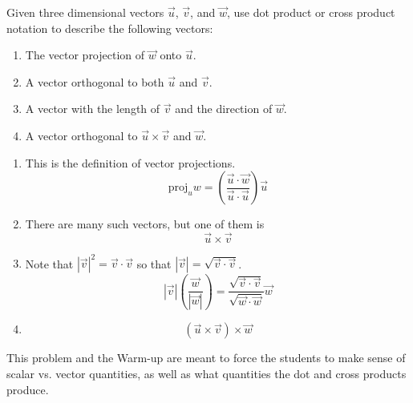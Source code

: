 \documentclass[noinstructornotes]{ximera}
\begin{document}
\begin{problem}
Given three dimensional vectors $\vec{u}$, $\vec{v}$, and $\vec{w}$, use dot product or cross product notation to describe the following vectors:
	\begin{enumerate}
	\item  The vector projection of $\vec{w}$ onto $\vec{u}$.
	
	\item  A vector orthogonal to both $\vec{u}$ and $\vec{v}$.
	
	\item  A vector with the length of $\vec{v}$ and the direction of $\vec{w}$.  
	
	\item  A vector orthogonal to $\vec{u} \times \vec{v}$ and $\vec{w}$.
	\end{enumerate}
	
	\begin{freeResponse}
	\begin{enumerate}
	\item  This is the definition of vector projections.
		\[
		\text{proj}_u w = \boxed{\left( \frac{\vec{u} \cdot \vec{w}}{\vec{u} \cdot \vec{u}} \right) \vec{u}}
		\]
	
	\item  There are many such vectors, but one of them is
		\[
		\boxed{\vec{u} \times \vec{v}}
		\]
	
	\item  Note that $|\vec{v}|^2 = \vec{v} \cdot \vec{v}$ so that $|\vec{v}|=\sqrt{\vec{v} \cdot \vec{v}}$. 
		\[
		| \vec{v} | \left( \frac{\vec{w}}{| \vec{w} |} \right) = \boxed{ \frac{\sqrt{\vec{v} \cdot \vec{v}}}{\sqrt{\vec{w} \cdot \vec{w}}} \vec{w}}
		\]
	
	\item  
		\[
		\boxed{(\vec{u} \times \vec{v}) \times \vec{w}}
		\]
	\end{enumerate}
	\end{freeResponse}
	
\end{problem}

\begin{instructorNotes}
This problem and the Warm-up are meant to force the students to make sense of scalar vs. vector quantities, as well as what quantities the dot and cross products produce.
\end{instructorNotes}
\end{document}
